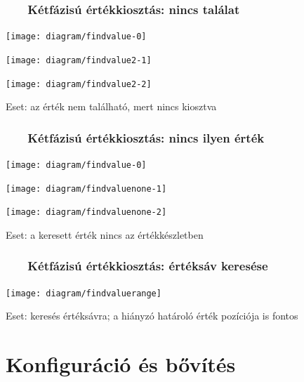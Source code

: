 \documentclass[
]{beamer}
\newcommand{\slidetitle}[2]{\frametitle{{\small #1 ~ \ding{226} ~ } \normalsize \textbf{#2} }}
\begin{document}
\begin{frame}
    \slidetitle{\sectionshorttitle}{Kétfázisú értékkiosztás: nincs találat}
    
    \centering
    
    \begin{overprint}
        \centerline{\texttt{[image: diagram/findvalue-0]}}
        \centerline{\texttt{[image: diagram/findvalue2-1]}}
        \centerline{\texttt{[image: diagram/findvalue2-2]}}
    \end{overprint}
    
    \vspace{0.7cm}
    
    Eset: az érték nem található, mert nincs kiosztva
\end{frame}

\begin{frame}
    \slidetitle{\sectionshorttitle}{Kétfázisú értékkiosztás: nincs ilyen érték}
    
    \centering
    
    \begin{overprint}
        \centerline{\texttt{[image: diagram/findvalue-0]}}
        \centerline{\texttt{[image: diagram/findvaluenone-1]}}
        \centerline{\texttt{[image: diagram/findvaluenone-2]}}
    \end{overprint}
    
    \vspace{0.7cm}
    
    Eset: a keresett érték nincs az értékkészletben
\end{frame}

\begin{frame}
    \slidetitle{\sectionshorttitle}{Kétfázisú értékkiosztás: értéksáv keresése}
    
    \centering
    
    \texttt{[image: diagram/findvaluerange]}
    
    \vspace{0.7cm}
    
    Eset: keresés értéksávra; a hiányzó határoló érték pozíciója is fontos
\end{frame}

\section{Konfiguráció és bővítés}
\def\sectionshorttitle{Konfiguráció és bővítés}
\end{document}
